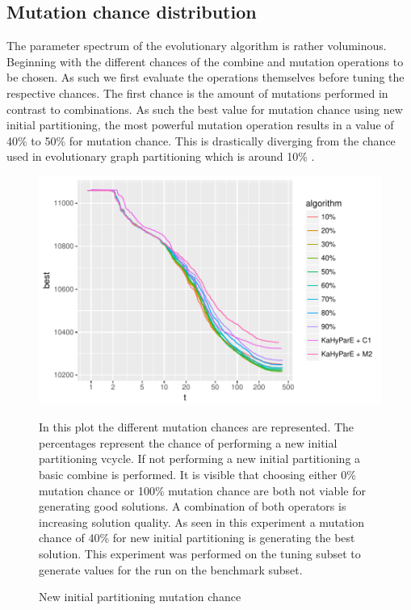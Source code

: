\documentclass[a4paper,12pt,titlepage, BCOR7mm,headsepline]{scrbook}
\numberwithin{equation}{section}
\begin{document}
\subsection{Mutation chance distribution}
The parameter spectrum of the evolutionary algorithm is rather voluminous. Beginning with the different chances of the combine and mutation operations to be chosen. As such we first evaluate the operations themselves before tuning the respective chances. The first chance is the amount of mutations performed in contrast to combinations. As such the best value for mutation chance using new initial partitioning, the most powerful mutation operation results in a value of 40\% to 50\% for mutation chance. This is drastically diverging from the chance used in evolutionary graph partitioning which is around 10\% \cite{sanders2012distributed}. 
\begin{figure}[H]
\caption{New initial partitioning mutation chance}
\begin{center}
\includegraphics{bachelorarbeit-newipmutationchance}
\end{center}
In this plot the different mutation chances are represented. The percentages represent the chance of performing a new initial partitioning vcycle. If not performing a new initial partitioning a basic combine is performed. It is visible that choosing either 0\% mutation chance or 100\% mutation chance are both not viable for generating good solutions. A combination of both operators is increasing solution quality. As seen in this experiment a mutation chance of 40\% for new initial partitioning is generating the best solution. This experiment was performed on the tuning subset to generate values for the run on the benchmark subset.
\end{figure}
\end{document}
